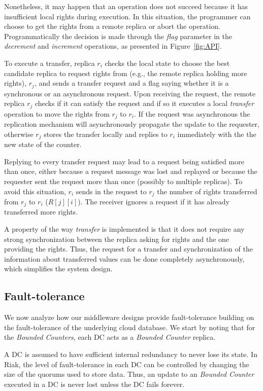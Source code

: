 \documentclass[conference]{IEEEtran}
\newcommand{\InvCounter}{\emph{Bounded Counter}}
\newcommand{\InvCounters}{\emph{Bounded Counters}}
\begin{document}
Nonetheless, it may happen that an operation does not succeed because it has insufficient
local rights during execution.
In this situation, the programmer can choose to get the rights from a remote replica
or abort the operation.
Programmatically the decision is made through the \emph{flag} parameter 
in the \emph{decrement} and \emph{increment} operations, as presented in Figure~\ref{fig:API}.

To execute a transfer, replica $r_i$ checks the local state
to choose the best candidate replica to request rights from (e.g., the remote replica holding more rights), 
$r_j$, and sends a transfer request and a flag saying whether it is a synchronous or an asynchronous request.
Upon receiving the request, the remote replica $r_j$ checks if it can satisfy the request
and if so it executes a local \emph{transfer} operation to move
the rights from $r_j$ to $r_i$. 
If the request was asynchronous the replication 
mechanism will asynchronously propagate the update to the requester, 
otherwise $r_j$ stores the transfer locally and replies to $r_i$ 
immediately with the the new state of the counter.

Replying to every transfer request may lead to a request being satisfied more 
than once, either because a request message was lost and replayed or because the 
requester sent the request more than once (possibly to multiple replicas).
To avoid this situation, $r_i$ sends in the request to $r_j$ the number 
of rights transferred from $r_j$ to $r_i$ ($R[j][i]$).
The receiver ignores a request if it has already transferred more rights.

A property of the way \emph{transfer} is implemented is that it does not 
require any strong synchronization between the replica asking for rights and 
the one providing the rights. 
Thus, the request for a transfer and synchronization of the information 
about transferred values can be done completely asynchronously, 
which simplifies the system design. 

\subsection{Fault-tolerance}

We now analyze how our middleware designs provide fault-tolerance
building on the fault-tolerance of the underlying cloud
database. 
We start by noting that for the \InvCounters{}, each DC acts as a 
\InvCounter{} replica.

A DC is assumed to have sufficient internal redundancy to never lose its state.
In Riak, the level of fault-tolerance in each DC can be controlled by 
changing the size of the quorums used to store data.
Thus, an update to an \InvCounter{} executed in a DC is never lost 
unless the DC fails forever.
\end{document}
